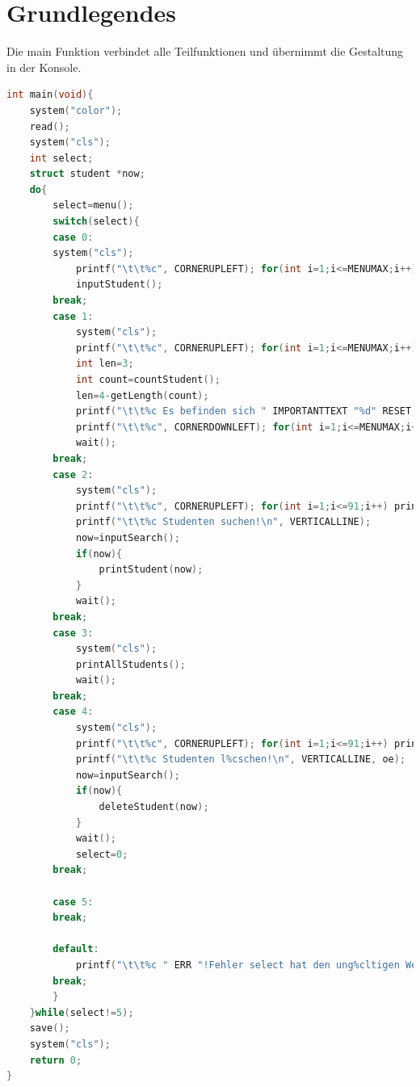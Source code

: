 \documentclass[a4paper, 11pt, oneside]{book} %
\begin{document}
\section{Grundlegendes}
Die main Funktion verbindet alle Teilfunktionen und übernimmt die Gestaltung in der Konsole.
\begin{lstlisting}[language=C]
	int main(void){
    system("color"); 
    read();
    system("cls");
    int select;
    struct student *now;
    do{
        select=menu();
        switch(select){
        case 0:
        system("cls");
            printf("\t\t%c", CORNERUPLEFT); for(int i=1;i<=MENUMAX;i++) printf("%c", HORIZONLINE); printf("%c\n", CORNERUPRIGHT);
            inputStudent();
        break;
        case 1:
            system("cls");
            printf("\t\t%c", CORNERUPLEFT); for(int i=1;i<=MENUMAX;i++) printf("%c", HORIZONLINE); printf("%c\n", CORNERUPRIGHT);
            int len=3;
            int count=countStudent();
            len=4-getLength(count);
            printf("\t\t%c Es befinden sich " IMPORTANTTEXT "%d" RESET, VERTICALLINE, count);  printf(" Eintr%cge in der Datenbank!     ", ae); for(int i=0;i<len;i++) printf(" "); printf("%c\n", VERTICALLINE);
            printf("\t\t%c", CORNERDOWNLEFT); for(int i=1;i<=MENUMAX;i++) printf("%c", HORIZONLINE); printf("%c\n", CORNERDOWNRIGHT);
            wait();
        break;
        case 2:
            system("cls");
            printf("\t\t%c", CORNERUPLEFT); for(int i=1;i<=91;i++) printf("%c", HORIZONLINE); printf("%c\n", CORNERUPRIGHT);
            printf("\t\t%c Studenten suchen!\n", VERTICALLINE); 
            now=inputSearch();
            if(now){
                printStudent(now);
            }
            wait();
        break;
        case 3:
            system("cls");
            printAllStudents();
            wait();
        break;
        case 4:
            system("cls");
            printf("\t\t%c", CORNERUPLEFT); for(int i=1;i<=91;i++) printf("%c", HORIZONLINE); printf("%c\n", CORNERUPRIGHT);
            printf("\t\t%c Studenten l%cschen!\n", VERTICALLINE, oe); 
            now=inputSearch();
            if(now){
                deleteStudent(now);
            }
            wait();
            select=0;
        break;
        
        case 5:
        break;
        
        default:
            printf("\t\t%c " ERR "!Fehler select hat den ung%cltigen Wert '%d'!\n" RESET, VERTICALLINE, ue, select);
        break;
        }
    }while(select!=5);
    save();
    system("cls");
    return 0;
}
\end{lstlisting}
\end{document}
